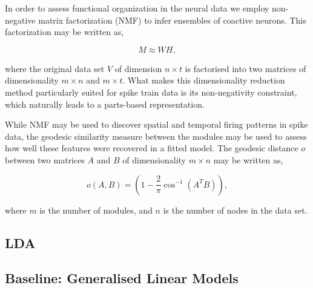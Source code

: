 \documentclass[mphil,deptreport,ai]{infthesis} %
\begin{document}
In order to assess functional organization in the neural data we employ non-negative matrix factorization (NMF) \cite{Seung1999} to infer ensembles of coactive neurons. 
This factorization may be written as,

\begin{equation}
    M \approx WH,
\end{equation}

where the original data set $V$ of dimension $n \times t$ is factorised into two matrices of dimensionality $m \times n$ and $m \times t$.
What makes this dimensionality reduction method particularly suited for spike train data is its non-negativity constraint, which naturally leads to a parts-based representation. %

While NMF may be used to discover spatial and temporal firing patterns in spike data, the geodesic similarity measure between the modules may be used to assess how well these features were recovered in a fitted model.
The geodesic distance $o$ between two matrices $A$ and $B$ of dimensionality $m \times n$ may be written as,

\begin{equation}
    o(A, B) = (1-\frac{2}{\pi}\cos^{-1}(A^TB)),
\end{equation}

where $m$ is the number of modules, and $n$ is the number of nodes in the data set. 

\subsection{LDA}

\cite{Onken2016a}


\subsection{Baseline: Generalised Linear Models}
\end{document}
